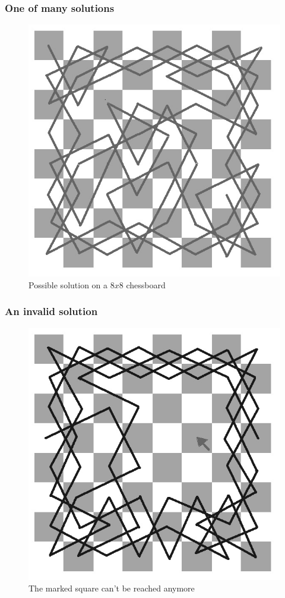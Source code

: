 \documentclass{beamer}
\begin{document}
\begin{frame}
\frametitle{One of many solutions}
\begin{figure}
\includegraphics[scale=0.4]{loesung}
\caption{Possible solution on a $8x8$ chessboard}
\end{figure}
\end{frame}

\begin{frame}
\frametitle{An invalid solution}
\begin{figure}
\includegraphics[scale=0.4]{luecke}
\caption{The marked square can't be reached anymore}
\end{figure}
\end{frame}
\end{document}
